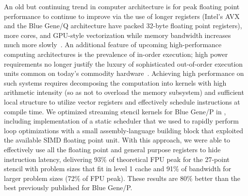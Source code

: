 An old \cite{mccalpin2007stream} but continuing trend in computer architecture is for peak floating point performance to continue to improve via the use of longer registers (Intel's AVX and the Blue Gene/Q architecture have packed 32-byte floating point registers), more cores, and GPU-style vectorization while memory bandwidth increases much more slowly~\cite{keyes2011exaflop}.
An additional feature of upcoming high-performance computing architectures is the prevalence of in-order execution; high power requirements no longer justify the luxury of sophisticated out-of-order execution units common on today's commodity hardware~\cite{seiler2008larrabee,pham2006overview}.
Achieving high performance on such systems requires decomposing the computation into kernels with high arithmetic intensity (so as not to overload the memory subsystem) and sufficient local structure to utilize vector registers and effectively schedule instructions at compile time.
We optimized streaming stencil kernels for Blue Gene/P in \cite{malas2011streaming}, including implementation of a static scheduler that we used to rapidly perform loop optimizations with a small assembly-language building block that exploited the available SIMD floating point unit.
With this approach, we were able to effectively use all the floating point and general purpose registers to hide instruction latency, delivering 93\% of theoretical FPU peak for the 27-point stencil with problem sizes that fit in level 1 cache and 91\% of bandwidth for larger problem sizes (72\% of FPU peak).
These results are 80\% better than the best previously published for Blue Gene/P.

